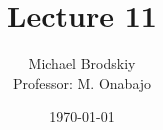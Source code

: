 


\title{Lecture 11}
\date{\today}
\author{Michael Brodskiy\\ \small Professor: M. Onabajo}



\maketitle


